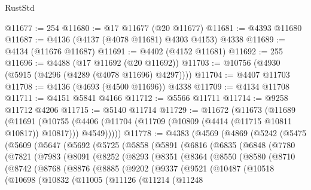 \begin{lexlean}{RustStd}
\begin{coremodule}
{\begin{coremodule}
{{{{{{{{{{{{{{{{{{{{{{{{{{{{{{{{{{{{{{{{{{{{{{{{{{@11677 := 254
@11680 := @17 @11677 (@20 @11677)
@11681 := @4393 @11680
@11687 := @4136 (@4137 (@4078 @11681) @4303 @4153) @4338
@11689 := @4134 (@11676 @11687)
@11691 := @4402 (@4152 @11681)
@11692 := 255
@11696 := @4488 (@17 @11692 (@20 @11692))
@11703 := @10756 (@4930 (@5915 (@4296 (@4289 (@4078 @11696) @4297))))
@11704 := @4407 @11703
@11708 := @4136 (@4693 (@4500 @11696)) @4338
@11709 := @4134 @11708
@11711 := @4151 @5841 @4166
@11712 := @5566 @11711
@11714 := @9258 @11712 @4206
@11715 := @5140 @11714
@11729 := @11672
    (@11673
      (@11689
        (@11691
          (@10755 (@4406 (@11704 (@11709 (@10809 (@4414 (@11715 @10811 @10817)) @10817))) @4549)))))
@11778 := @4383
    (@4569
      (@4869
        (@5242
          (@5475
            (@5609
              (@5647
                (@5692
                  (@5725
                    (@5858
                      (@5891
                        (@6816
                          (@6835
                            (@6848
                              (@7780
                                (@7821
                                  (@7983
                                    (@8091
                                      (@8252
                                        (@8293
                                          (@8351
                                            (@8364
                                              (@8550
                                                (@8580
                                                  (@8710
                                                    (@8742
                                                      (@8768
                                                        (@8876
                                                          (@8885
                                                            (@9202
                                                              (@9337
                                                                (@9521
                                                                  (@10487
                                                                    (@10518
                                                                      (@10698
                                                                        (@10832
                                                                          (@11005
                                                                            (@11126
                                                                              (@11214
                                                                                (@11248
}}}}}}}}}}}}}}}}}}}}}}}}}}}}}}}}}}}}}}}}}}}}}}}}}}
\end{coremodule}}
\end{coremodule}
\end{lexlean}
